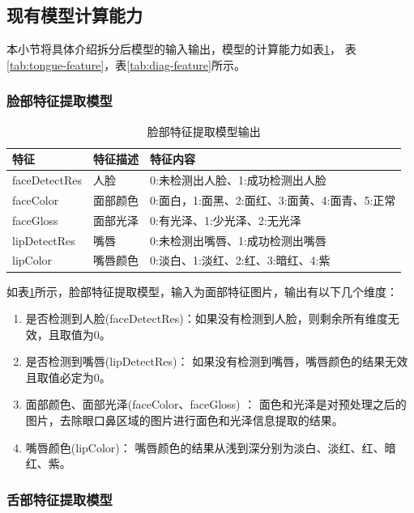 \subsection{现有模型计算能力}
本小节将具体介绍拆分后模型的输入输出，模型的计算能力如表\ref{tab:face-feature}， 表\ref{tab:tongue-feature}，表\ref{tab:diag-feature}所示。
\subsubsection{脸部特征提取模型}

\begin{table}[h]
    \centering
    \caption{脸部特征提取模型输出}
    \begin{tabular}{lll}
        \toprule
        特征          & 特征描述     & 特征内容 \\ 
        \midrule
        faceDetectRes & 人脸   & 0:未检测出人脸、1:成功检测出人脸  \\
        faceColor     & 面部颜色 & 0:面白，1:面黑、2:面红、3:面黄、4:面青、5:正常 \\
        faceGloss     & 面部光泽 & 0:有光泽、1:少光泽、2:无光泽\\
        lipDetectRes  & 嘴唇   & 0:未检测出嘴唇、1:成功检测出嘴唇\\
        lipColor      & 嘴唇颜色 & 0:淡白、1:淡红、2:红、3:暗红、4:紫   \\
        \bottomrule
    \end{tabular}
    \label{tab:face-feature}
\end{table}

如表\ref{tab:face-feature}所示，脸部特征提取模型，输入为面部特征图片，输出有以下几个维度：
\begin{enumerate}
    \item 是否检测到人脸(faceDetectRes)：如果没有检测到人脸，则剩余所有维度无效，且取值为0。

    \item 是否检测到嘴唇(lipDetectRes)： 如果没有检测到嘴唇，嘴唇颜色的结果无效且取值必定为0。

    \item 面部颜色、面部光泽(faceColor、faceGloss) ： 面色和光泽是对预处理之后的图片，去除眼口鼻区域的图片进行面色和光泽信息提取的结果。

    \item 嘴唇颜色(lipColor)： 嘴唇颜色的结果从浅到深分别为淡白、淡红、红、暗红、紫。
\end{enumerate}


\subsubsection{舌部特征提取模型}

